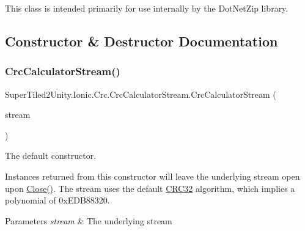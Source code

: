 This class is intended primarily for use internally by the Dot\+Net\+Zip library. 

\subsection{Constructor \& Destructor Documentation}
\mbox{\label{class_super_tiled2_unity_1_1_ionic_1_1_crc_1_1_crc_calculator_stream_a9c07a721e770fb603dd764c572a0eba6}} 
\subsubsection{\texorpdfstring{Crc\+Calculator\+Stream()}{CrcCalculatorStream()}\hspace{0.1cm}{\footnotesize\ttfamily [1/5]}}
{\footnotesize\ttfamily Super\+Tiled2\+Unity.\+Ionic.\+Crc.\+Crc\+Calculator\+Stream.\+Crc\+Calculator\+Stream (\begin{DoxyParamCaption}\item[{System.\+I\+O.\+Stream}]{stream }\end{DoxyParamCaption})}



The default constructor. 

Instances returned from this constructor will leave the underlying stream open upon \mbox{\hyperlink{class_super_tiled2_unity_1_1_ionic_1_1_crc_1_1_crc_calculator_stream_af4509c6b2480109b3b52f3881b5a8f5f}{Close()}}. The stream uses the default \mbox{\hyperlink{class_super_tiled2_unity_1_1_ionic_1_1_crc_1_1_c_r_c32}{C\+R\+C32}} algorithm, which implies a polynomial of 0x\+E\+D\+B88320. 


\begin{DoxyParams}{Parameters}
{\em stream} & The underlying stream\\
\hline
\end{DoxyParams}
\mbox{\label{class_super_tiled2_unity_1_1_ionic_1_1_crc_1_1_crc_calculator_stream_a69ee8f78e7559698ab9c4e23618e184e}} 
